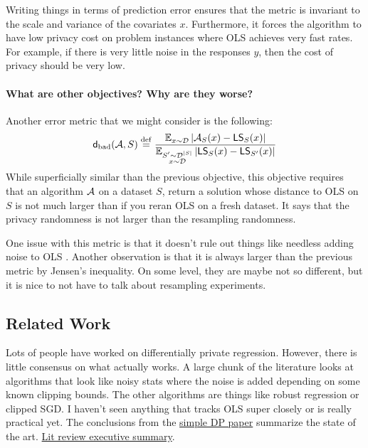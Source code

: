 Writing things in terms of prediction error ensures that the metric is invariant to the scale and variance of the covariates $x$. Furthermore, it forces the algorithm to have low privacy cost on problem instances where OLS achieves very fast rates. For example, if there is very little noise in the responses $y$, then the cost of privacy should be very low.



\paragraph{What are other objectives? Why are they worse?} Another error metric that we might consider is the following:  
\begin{align*}
\mathsf{d}_{\mathrm{bad}}({\cal A}, S) \stackrel{\small \mathrm{def}}{=} \frac{\operatorname*{\mathbb{E}}_{\substack{x \sim {\cal D}}} |{\cal A}_S(x) - \mathsf{LS}_S(x)|}{\operatorname*{\mathbb{E}}_{\substack{S'\sim \mathcal D^{|S|} \\ x \sim {\cal D}}} |\mathsf{LS}_{S}(x) - \mathsf{LS}_{S'}(x)|}
\end{align*}
While superficially similar than the previous objective, this objective requires that an algorithm ${\cal A}$ on a dataset $S$, return a solution whose distance to OLS on $S$ is not much larger than if you reran OLS on a fresh dataset. It says that the privacy randomness is not larger than the resampling randomness. 

One issue with this metric is that it doesn't rule out things like needless adding noise to OLS . Another observation is that it is always larger than the previous metric by Jensen's inequality. On some level, they are maybe not so different, but it is nice to not have to talk about resampling experiments. 



\subsection{Related Work}

Lots of people have worked on differentially private regression. However, there is little consensus on what actually works. A large chunk of the literature looks at algorithms that look like noisy stats where the noise is added depending on some known clipping bounds. The other algorithms are things like robust regression or clipped SGD. I haven't seen anything that tracks OLS super closely or is really practical yet. The conclusions from the \href{https://arxiv.org/abs/2007.05157}{simple DP paper} summarize the state of the art. \href{https://docs.google.com/document/d/1W0M2J9ZHaVqzfdyIympQ81bZxb8tgadG7jI9iI2uHRA/edit}{Lit review executive summary}.






